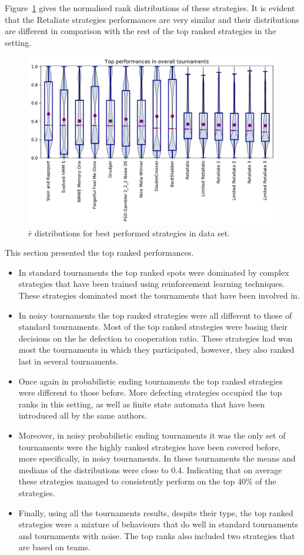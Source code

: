 \documentclass{article}
\begin{document}
Figure~\ref{fig:overall_results} gives the normalised rank distributions
of these strategies. It is evident that the Retaliate strategies performances
are very similar and their distributions are different in comparison with the
rest of the top ranked strategies in the setting.

\begin{figure}[!htbp]
    \centering
    \includegraphics[width=.8\textwidth]{../images/performance_merged.pdf}
    \caption{\(\bar{r}\) distributions for best performed strategies in data set.}
    \label{fig:overall_results}
\end{figure}

This section presented the top ranked performances.

\begin{itemize}
    \item In standard tournaments the top ranked spots were dominated by complex
    strategies that have been trained using reinforcement learning techniques.
    These strategies dominated most the tournaments that have been involved in.
    \item In noisy tournaments the top ranked strategies were all different to those of standard
    tournaments. Most of the top ranked strategies were basing their decisions
    on the he defection to cooperation ratio. These
    strategies had won most the tournaments in which they participated, however,
    they also ranked last in several tournaments.
    \item Once again in probabilistic ending tournaments the top ranked
    strategies were different to those before. More defecting strategies
    occupied the top ranks in this setting, as well as finite state automata
    that have been introduced all by the same authors.
    \item Moreover, in noisy probabilistic ending tournaments it was the only
    set of tournaments were the highly ranked strategies have been covered
    before, more specifically, in noisy tournaments. In these tournaments the
    means and medians of the distributions were close to 0.4. Indicating that on
    average these strategies managed to consistently perform on the top 40\% of
    the strategies.
    \item Finally, using all the tournaments results, despite their type, the top
    ranked strategies were a mixture of behaviours that do well in standard
    tournaments and tournaments with noise. The top ranks also included two
    strategies that are based on teams.
\end{itemize}
\end{document}
